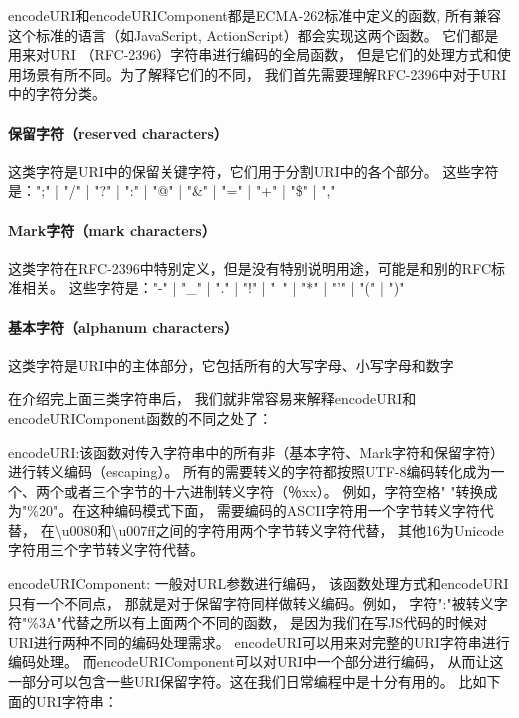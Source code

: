 \documentclass{book}
\begin{document}
encodeURI和encodeURIComponent都是ECMA-262标准中定义的函数,
所有兼容这个标准的语言（如JavaScript, ActionScript）都会实现这两个函数。
它们都是用来对URI （RFC-2396）字符串进行编码的全局函数，
但是它们的处理方式和使用场景有所不同。为了解释它们的不同，
我们首先需要理解RFC-2396中对于URI中的字符分类。

\paragraph{保留字符（reserved characters）}

这类字符是URI中的保留关键字符，它们用于分割URI中的各个部分。
这些字符是：";" | "/" | "?" | ":" | "@" | "\&" | "=" | "+" | "\$" | "," 

\paragraph{Mark字符（mark characters）}

这类字符在RFC-2396中特别定义，但是没有特别说明用途，可能是和别的RFC标准相关。 
这些字符是："-" | "\_" | "." | "!" | "~" | "*" | "'" | "(" | ")" 

\paragraph{基本字符（alphanum characters）}

这类字符是URI中的主体部分，它包括所有的大写字母、小写字母和数字

在介绍完上面三类字符串后，
我们就非常容易来解释encodeURI和encodeURIComponent函数的不同之处了：

encodeURI:该函数对传入字符串中的所有非（基本字符、Mark字符和保留字符）进行转义编码（escaping）。
所有的需要转义的字符都按照UTF-8编码转化成为一个、两个或者三个字节的十六进制转义字符（％xx）。
例如，字符空格" "转换成为"\%20"。在这种编码模式下面，
需要编码的ASCII字符用一个字节转义字符代替，
在\textbackslash u0080和\textbackslash u007ff之间的字符用两个字节转义字符代替，
其他16为Unicode字符用三个字节转义字符代替。

encodeURIComponent: 一般对URL参数进行编码，
该函数处理方式和encodeURI只有一个不同点，
那就是对于保留字符同样做转义编码。例如，
字符":"被转义字符"\%3A"代替之所以有上面两个不同的函数，
是因为我们在写JS代码的时候对URI进行两种不同的编码处理需求。
encodeURI可以用来对完整的URI字符串进行编码处理。
而encodeURIComponent可以对URI中一个部分进行编码，
从而让这一部分可以包含一些URI保留字符。这在我们日常编程中是十分有用的。
比如下面的URI字符串：
\end{document}
